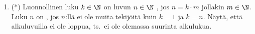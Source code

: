 \begin{enumerate}
\item (*) 
Luonnollinen luku $k\in\N$ on luvun $n\in\N$ , jos $n=k \cdot m$ jollakin $m\in\N$.
Luku $n$ on , jos $n$:llä ei ole muita tekijöitä kuin $k=1$ ja $k=n$. Näytä, että
alkuluvuilla ei ole loppua, ts.\ ei ole olemassa suurinta alkulukua.

\end{enumerate}